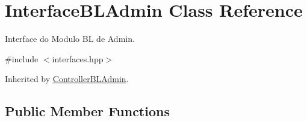 \hypertarget{class_interface_b_l_admin}{}\section{Interface\+B\+L\+Admin Class Reference}
\label{class_interface_b_l_admin}


Interface do Modulo BL de Admin.  




{\ttfamily \#include $<$interfaces.\+hpp$>$}



Inherited by \hyperlink{class_controller_b_l_admin}{Controller\+B\+L\+Admin}.

\subsection*{Public Member Functions}
